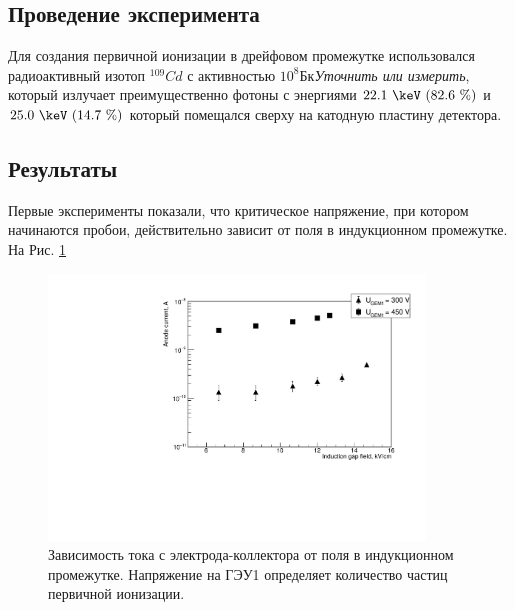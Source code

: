 \subsection{Проведение эксперимента}
Для создания первичной ионизации в дрейфовом промежутке использовался радиоактивный изотоп $^{109}Cd$ с активностью $10^8 \text{Бк}$\textit{Уточнить или измерить}, который излучает преимущественно фотоны с энергиями $22.1~\keV~(82.6~\%)$ и $25.0~\keV~(14.7~\%)$ который помещался сверху на катодную пластину детектора. 
\subsection{Результаты}
Первые эксперименты показали, что критическое напряжение, при котором начинаются пробои, действительно зависит от поля в индукционном промежутке. На Рис. \ref{Raether_graph_2}
\begin{figure}[H]
	\begin{center}
		\includegraphics[width = 10cm]{img/Raether_graph_2.pdf}
		\caption{Зависимость тока с электрода-коллектора от поля в индукционном промежутке. Напряжение на ГЭУ1 определяет количество частиц первичной ионизации.}
		\label{Raether_graph_2}
	\end{center}
\end{figure}

